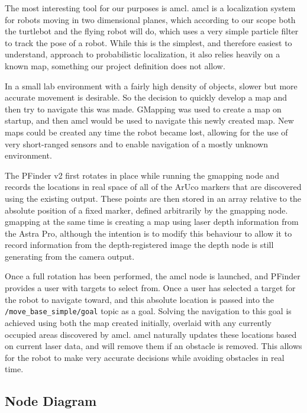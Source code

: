 \documentclass{article}[12]
\begin{document}
	The most interesting tool for our purposes is amcl. amcl is a localization system for robots moving in two dimensional planes, which according to our scope both the turtlebot and the flying robot will do, which uses a very simple particle filter to track the pose of a robot. While this is the simplest, and therefore easiest to understand, approach to probabilistic localization, it also relies heavily on a known map, something our project definition does not allow.
	
	In a small lab environment with a fairly high density of objects, slower but more accurate movement is desirable. So the decision to quickly develop a map and then try to navigate this was made. GMapping was used to create a map on startup, and then amcl would be used to navigate this newly created map. New maps could be created any time the robot became lost, allowing for the use of very short-ranged sensors and to enable navigation of a mostly unknown environment.
	
	The PFinder v2 first rotates in place while running the gmapping node and records the locations in real space of all of the ArUco markers that are discovered using the existing output. These points are then stored in an array relative to the absolute position of a fixed marker, defined arbitrarily by the gmapping node. gmapping at the same time is creating a map using laser depth information from the Astra Pro, although the intention is to modify this behaviour to allow it to record information from the depth-registered image the depth node is still generating from the camera output.
	
	Once a full rotation has been performed, the amcl node is launched, and PFinder provides a user with targets to select from. Once a user has selected a target for the robot to navigate toward, and this absolute location is passed into the \texttt{/move\_base\_simple/goal} topic as a goal. Solving the navigation to this goal is achieved using both the map created initially, overlaid with any currently occupied areas discovered by amcl. amcl naturally updates these locations based on current laser data, and will remove them if an obstacle is removed. This allows for the robot to make very accurate decisions while avoiding obstacles in real time. 
	
	\subsection{Node Diagram}
\end{document}
